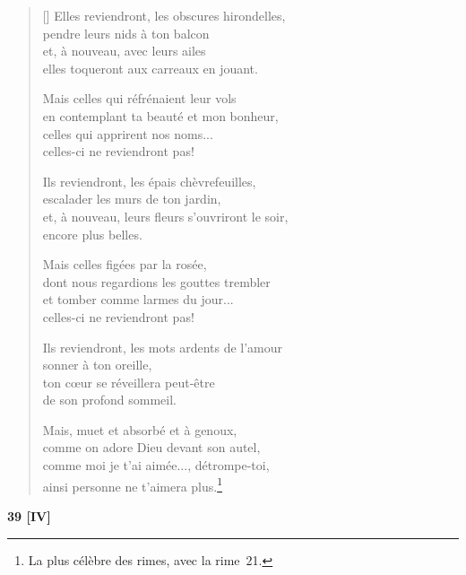 \documentclass[a4paper,12pt]{book}
\begin{document}
\begin{verse}[\versewidth]
  Elles reviendront, les obscures hirondelles, \\
  pendre leurs nids à ton balcon \\
  et, à nouveau, avec leurs ailes \\
  elles toqueront aux carreaux en jouant.

  Mais celles qui réfrénaient leur vols \\
  en contemplant ta beauté et mon bonheur, \\
  celles qui apprirent nos noms... \\
  celles-ci ne reviendront pas!

  Ils reviendront, les épais chèvrefeuilles, \\
  escalader les murs de ton jardin, \\
  et, à nouveau, leurs fleurs s'ouvriront le soir, \\
  encore plus belles.

  Mais celles figées par la rosée, \\
  dont nous regardions les gouttes trembler \\
  et tomber comme larmes du jour... \\
  celles-ci ne reviendront pas!

  Ils reviendront, les mots ardents de l'amour \\
  sonner à ton oreille, \\
  ton cœur se réveillera peut-être \\
  de son profond sommeil.

  Mais, muet et absorbé et à genoux, \\
  comme on adore Dieu devant son autel, \\
  comme moi je t'ai aimée..., détrompe-toi, \\
  ainsi personne ne t'aimera plus.\footnote{La plus célèbre des rimes,
  avec la rime~21.}
\end{verse}

\bigskip

\begin{center}
  \textbf{39 [IV]}
\end{center}

\settowidth{\versewidth}{tant qu'il existera une femme splendide,}
\end{document}
